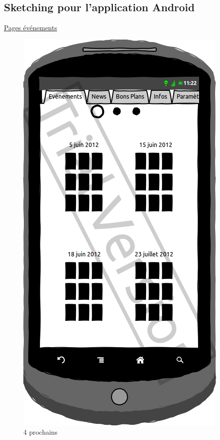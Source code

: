 \documentclass[a4paper, 11pt]{article}
\begin{document}
\subsection{Sketching pour l'application Android}
\underline{Pages événements}
\begin{figure}[h!]
	\begin{minipage}[c]{.50\linewidth}
		\begin{center}
			\includegraphics[scale=0.29]{../../Sketch/Android/quatreEvent.png}
		\end{center}
	\caption{4 prochains}
	\end{minipage}
	\hfill
	\begin{minipage}[c]{.50\linewidth}
		\begin{center}

\end{center}
\end{minipage}
\end{figure}
\end{document}
